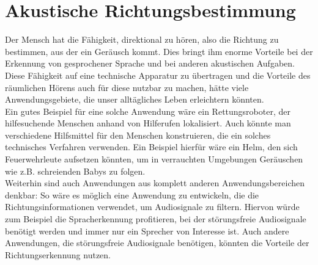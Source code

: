\section{Akustische Richtungsbestimmung}
Der Mensch hat die Fähigkeit, direktional zu hören, also die Richtung zu bestimmen, aus der ein Geräusch kommt. Dies bringt ihm enorme Vorteile bei der Erkennung von gesprochener Sprache und bei anderen akustischen Aufgaben. Diese Fähigkeit auf eine technische Apparatur zu übertragen und die Vorteile des räumlichen Hörens auch für diese nutzbar zu machen, hätte viele Anwendungsgebiete, die unser alltägliches Leben erleichtern könnten.\\
Ein gutes Beispiel für eine solche Anwendung wäre ein Rettungsroboter, der hilfesuchende Menschen anhand von Hilferufen lokalisiert. Auch könnte man verschiedene Hilfsmittel für den Menschen konstruieren, die ein solches technisches Verfahren verwenden. Ein Beispiel hierfür wäre ein Helm, den sich Feuerwehrleute aufsetzen könnten, um in verrauchten Umgebungen Geräuschen wie z.B. schreienden Babys zu folgen.\\
Weiterhin sind auch Anwendungen aus komplett anderen Anwendungsbereichen denkbar: So wäre es möglich eine Anwendung zu entwickeln, die die Richtungsinformationen verwendet, um Audiosignale zu filtern. Hiervon würde zum Beispiel die Spracherkennung profitieren, bei der  störungsfreie Audiosignale benötigt werden und immer nur ein Sprecher von Interesse ist\cite{Spracherkennung}. Auch andere Anwendungen, die störungsfreie Audiosignale benötigen, könnten die Vorteile der Richtungserkennung nutzen. 
